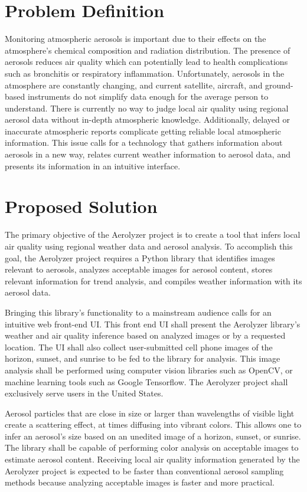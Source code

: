 \documentclass[letterpaper,10pt,draftclsnofoot,onecolumn]{IEEEtran}
\newcommand\tab[1][1cm]{\hspace*{#1}}
\begin{document}
\clearpage
\begin{flushleft}
\section{Problem Definition}
\tab Monitoring atmospheric aerosols is important due to their effects on the atmosphere's chemical composition and radiation distribution. The presence of aerosols reduces air quality which can potentially lead to health complications such as bronchitis or respiratory inflammation. Unfortunately, aerosols in the atmosphere are constantly changing, and current satellite, aircraft, and ground-based instruments do not simplify data enough for the average person to understand. There is currently no way to judge local air quality using regional aerosol data without in-depth atmospheric knowledge. Additionally, delayed or inaccurate atmospheric reports complicate getting reliable local atmospheric information. This issue calls for a technology that gathers information about aerosols in a new way, relates current weather information to aerosol data, and presents its information in an intuitive interface.

\section{Proposed Solution}
\tab The primary objective of the Aerolyzer project is to create a tool that infers local air quality using regional weather data and aerosol analysis. To accomplish this goal, the Aerolyzer project requires a Python library that identifies images relevant to aerosols, analyzes acceptable images for aerosol content, stores relevant information for trend analysis, and compiles weather information with its aerosol data. 
\par
\tab Bringing this library's functionality to a mainstream audience calls for an intuitive web front-end UI. This front end UI shall present the Aerolyzer library's weather and air quality inference based on analyzed images or by a requested location. The UI shall also collect user-submitted cell phone images of the horizon, sunset, and sunrise to be fed to the library for analysis. This image analysis shall be performed using computer vision libraries such as OpenCV, or machine learning tools such as Google Tensorflow. The Aerolyzer project shall exclusively serve users in the United States.

\par
\tab Aerosol particles that are close in size or larger than wavelengths of visible light create a scattering effect, at times diffusing into vibrant colors. This allows one to infer an aerosol's size based on an unedited image of a horizon, sunset, or sunrise. The library shall be capable of performing color analysis on acceptable images to estimate aerosol content. Receiving local air quality information generated by the Aerolyzer project is expected to be faster than conventional aerosol sampling methods because analyzing acceptable images is faster and more practical.


\end{flushleft}
\end{document}
